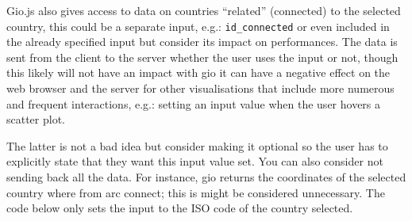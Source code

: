 \documentclass[
]{krantz}
\makeatletter
\newenvironment{Shaded}{\begin{snugshade}}{\end{snugshade}}
\newcommand{\ControlFlowTok}[1]{\textcolor[rgb]{0.27,0.27,0.27}{\textbf{#1}}}
\newcommand{\DataTypeTok}[1]{\textcolor[rgb]{0.27,0.27,0.27}{#1}}
\newcommand{\DecValTok}[1]{\textcolor[rgb]{0.06,0.06,0.06}{#1}}
\newcommand{\KeywordTok}[1]{\textcolor[rgb]{0.27,0.27,0.27}{\textbf{#1}}}
\newcommand{\NormalTok}[1]{#1}
\newcommand{\OperatorTok}[1]{\textcolor[rgb]{0.43,0.43,0.43}{\textbf{#1}}}
\newcommand{\StringTok}[1]{\textcolor[rgb]{0.5,0.5,0.5}{#1}}
\newenvironment{kframe}{%
\medskip{}
\setlength{\fboxsep}{.8em}
 \def\at@end@of@kframe{}%
 \ifinner\ifhmode%
  \def\at@end@of@kframe{\end{minipage}}%
  \begin{minipage}{\columnwidth}%
 \fi\fi%
 \def\FrameCommand##1{\hskip\@totalleftmargin \hskip-\fboxsep
 \colorbox{shadecolor}{##1}\hskip-\fboxsep
     \hskip-\linewidth \hskip-\@totalleftmargin \hskip\columnwidth}%
 \MakeFramed {\advance\hsize-\width
   \@totalleftmargin\z@ \linewidth\hsize
   \@setminipage}}%
 {\par\unskip\endMakeFramed%
 \at@end@of@kframe}
\renewenvironment{Shaded}{\begin{kframe}}{\end{kframe}}
\makeatother
\begin{document}
\begin{Shaded}
\end{Shaded}

Gio.js also gives access to data on countries ``related'' (connected) to the selected country, this could be a separate input, e.g.: \texttt{id\_connected} or even included in the already specified input but consider its impact on performances. The data is sent from the client to the server whether the user uses the input or not, though this likely will not have an impact with gio it can have a negative effect on the web browser and the server for other visualisations that include more numerous and frequent interactions, e.g.: setting an input value when the user hovers a scatter plot.

The latter is not a bad idea but consider making it optional so the user has to explicitly state that they want this input value set. You can also consider not sending back all the data. For instance, gio returns the coordinates of the selected country where from arc connect; this is might be considered unnecessary. The code below only sets the input to the ISO code of the country selected.
\end{document}
